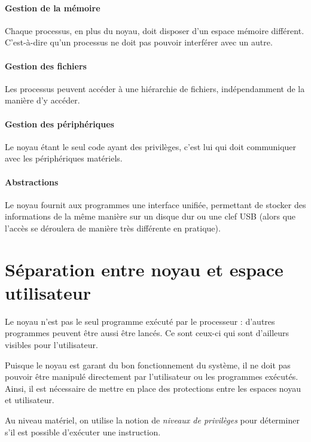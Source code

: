 \paragraph{Gestion de la mémoire}

Chaque processus, en plus du noyau, doit disposer d'un espace mémoire différent.
C'est-à-dire qu'un processus ne doit pas pouvoir interférer avec un autre.

\paragraph{Gestion des fichiers}

Les processus peuvent accéder à une hiérarchie de fichiers, indépendamment de la
manière d'y accéder.

\paragraph{Gestion des périphériques}

Le noyau étant le seul code ayant des privilèges, c'est lui qui doit communiquer
avec les périphériques matériels.

\paragraph{Abstractions}

Le noyau fournit aux programmes une interface unifiée, permettant de stocker des
informations de la même manière sur un disque dur ou une clef USB (alors que
l'accès se déroulera de manière très différente en pratique).

\section{Séparation entre noyau et espace utilisateur}

Le noyau n'est pas le seul programme exécuté par le processeur : d'autres
programmes peuvent être aussi être lancés. Ce sont ceux-ci qui sont d'ailleurs
visibles pour l'utilisateur.

Puisque le noyau est garant du bon fonctionnement du système, il ne doit pas
pouvoir être manipulé directement par l'utilisateur ou les programmes exécutés.
Ainsi, il est nécessaire de mettre en place des protections entre les espaces
noyau et utilisateur.

Au niveau matériel, on utilise la notion de \emph{niveaux de privilèges} pour
déterminer s'il est possible d'exécuter une instruction.

